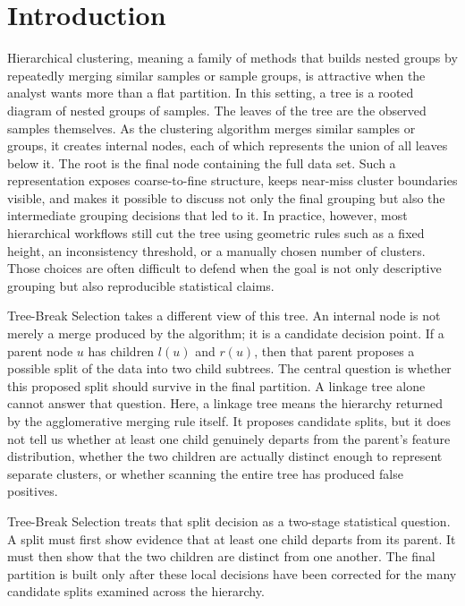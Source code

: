 
\section{Introduction}

Hierarchical clustering, meaning a family of methods that builds nested groups
by repeatedly merging similar samples or sample groups, is attractive when the
analyst wants more than a flat partition. In this setting, a tree is a rooted
diagram of nested groups of
samples. The leaves of the tree are the observed samples themselves. As the
clustering algorithm merges similar samples or groups, it creates internal
nodes, each of which represents the union of all leaves below it. The root is
the final node containing the full data set. Such a representation exposes
coarse-to-fine structure, keeps near-miss cluster boundaries visible, and makes
it possible to discuss not only the final grouping but also the intermediate
grouping decisions that led to it. In practice, however, most hierarchical
workflows still cut the tree using geometric rules such as a fixed
height, an inconsistency threshold, or a manually chosen number of clusters.
Those choices are often difficult to defend when the goal is not only
descriptive grouping but also reproducible statistical claims.

Tree-Break Selection takes a different view of this tree. An internal node is not merely a
merge produced by the algorithm; it is a candidate decision point. If a parent
node $u$ has children $l(u)$ and $r(u)$, then that parent proposes a possible
split of the data into two child subtrees. The central question is whether this
proposed split should survive in the final partition. A linkage tree alone
cannot answer that question. Here, a linkage tree means the hierarchy returned
by the agglomerative merging rule itself. It proposes candidate splits, but it
does not tell
us whether at least one child genuinely departs from the parent's feature
distribution, whether the two children are actually distinct enough to
represent separate clusters, or whether scanning the entire tree has produced
false positives.

Tree-Break Selection treats that split decision as a two-stage statistical question. A split
must first show evidence that at least one child departs from its parent. It
must then show that the two children are distinct from one another. The final
partition is built only after these local decisions have been corrected for the
many candidate splits examined across the hierarchy.

